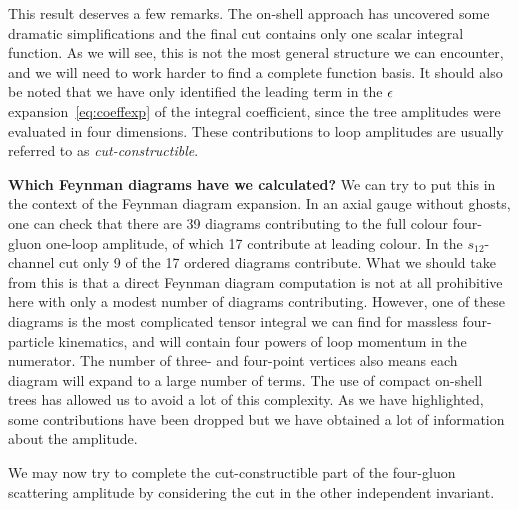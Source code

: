 This result deserves a few remarks. The on-shell approach has uncovered some
dramatic simplifications and the final cut contains only one scalar integral
function. As we will see, this is not the most general structure we can
encounter, and we will need to work harder to find a complete function basis. It
should also be noted that we have only identified the leading term in the
$\epsilon$ expansion~\eqref{eq:coeffexp} of the integral coefficient, since the tree amplitudes were
evaluated in four dimensions. These contributions to loop amplitudes are
usually referred to as \textit{cut-constructible}.

\begin{svgraybox}
\textbf{Which Feynman diagrams have we calculated?} We can try to put this in the context of the Feynman diagram expansion. In an
axial gauge without ghosts, one can check that there are 39 diagrams
contributing to the full colour four-gluon one-loop amplitude, of which 17
contribute at leading colour. In the $s_{12}$-channel cut only 9 of the 17
ordered diagrams contribute.  What we should take from this is that a direct
Feynman diagram computation is not at all prohibitive here with only a modest
number of diagrams contributing.  However, one of these diagrams is the most
complicated tensor integral we can find for massless four-particle kinematics,
and will contain four powers of loop momentum in the numerator. The number of
three- and four-point vertices also means each diagram will expand to a large
number of terms.  The use of compact on-shell trees has allowed us to avoid
a lot of this complexity. As we have highlighted, some contributions have been
dropped but we have obtained a lot of information about the amplitude.
\end{svgraybox}

We may now try to complete the cut-constructible part of the four-gluon
scattering amplitude by considering the cut in the other independent invariant.

\newpage 

